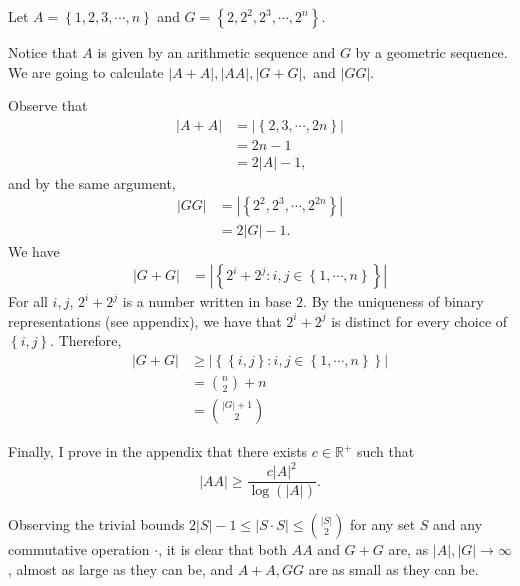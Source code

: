 \documentclass[12pt,reqno]{amsart}
\begin{document}
Let \(A = \left\{ 1, 2, 3, \cdots, n \right\}\) and \(G = \left\{ 2, 2^{2}, 2^{3}, \cdots , 2^{n} \right\}\).

Notice that \(A\) is given by an arithmetic sequence and \(G\) by a geometric sequence.
We are going to calculate \(\left\lvert A+A \right\rvert , \left\lvert AA \right\rvert , \left\lvert G+G \right\rvert ,\) and \(\left\lvert GG \right\rvert \).

Observe that
\begin{align*}
    \left\lvert A + A \right\rvert  & = \left\lvert \left\{2,3, \cdots ,2n \right\}  \right\rvert \\
    & = 2n - 1 \\
    & = 2 \left\lvert A \right\rvert - 1,
\end{align*}
and by the same argument,
\begin{align*}
    \left\lvert GG \right\rvert  & = \left\lvert \left\{2^{2}, 2^{3}, \cdots , 2^{2n} \right\} \right\rvert  \\
    & =2 \left\lvert G \right\rvert -1.
\end{align*}
We have
\begin{align*}
    \left\lvert G + G \right\rvert & = \left\lvert \left\{ 2^{i} + 2^{j} : i,j \in \left\{ 1, \cdots , n \right\} \right\} \right\rvert
\end{align*}
For all \(i,j\), \(2^{i} + 2^{j}\) is a number written in base \(2\). By the uniqueness of binary representations
(see appendix), we have that \(2^{i} + 2^{j}\) is distinct for every choice of \(\left\{ i,j \right\} \). Therefore,
\begin{align*}
    \left\lvert G + G \right\rvert & \geq  \left\lvert \left\{ \left\{ i,j \right\} : i,j \in \left\{ 1, \cdots , n \right\}  \right\}  \right\rvert \\
    & = \binom{n}{2} + n \\
    & = \binom{\left\lvert G \right\rvert + 1}{2} 
\end{align*}

Finally, I prove in the appendix that there exists \(c \in \mathbb{R} ^{+}\) such that
\[
    \left\lvert AA \right\rvert \geq  \frac{c \left\lvert A \right\rvert ^{2}}{\log \left( \left\lvert A \right\rvert  \right) }
.\]

Observing the trivial bounds \( 2 \left\lvert S \right\rvert - 1 \leq \left\lvert S \cdot S \right\rvert \leq \binom{\left\lvert S \right\rvert }{2} \) for any set \(S\) and any
commutative operation \(\cdot \), it is clear that both \(AA\) and \(G +G\) are, as \(\left\lvert A \right\rvert, \left\lvert G \right\rvert \to \infty  \), almost as large as they can be,
and \(A + A, GG \) are as small as they can be.
\end{document}
